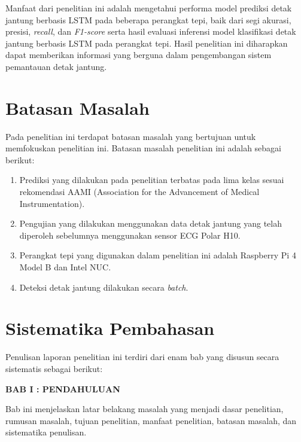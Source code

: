 Manfaat dari penelitian ini adalah mengetahui performa model prediksi detak jantung berbasis LSTM pada beberapa perangkat tepi, baik dari segi akurasi, presisi, \emph{recall}, dan \emph{F1-score} serta hasil evaluasi inferensi model klasifikasi detak jantung berbasis LSTM pada perangkat tepi.
Hasil penelitian ini diharapkan dapat memberikan informasi yang berguna dalam pengembangan sistem pemantauan detak jantung.


\section{Batasan Masalah}

Pada penelitian ini terdapat batasan masalah yang bertujuan untuk memfokuskan penelitian ini. Batasan masalah penelitian ini adalah sebagai berikut:
\begin{enumerate}
  \item Prediksi yang dilakukan pada penelitian terbatas pada lima kelas sesuai rekomendasi AAMI (Association for the Advancement of Medical Instrumentation).
  \item Pengujian yang dilakukan menggunakan data detak jantung yang telah diperoleh sebelumnya menggunakan sensor ECG Polar H10.
  \item Perangkat tepi yang digunakan dalam penelitian ini adalah Raspberry Pi 4 Model B dan Intel NUC.
  \item Deteksi detak jantung dilakukan secara \textit{batch}.
\end{enumerate}




\section{Sistematika Pembahasan}

Penulisan laporan penelitian ini terdiri dari enam bab yang disusun secara sistematis sebagai berikut:

\noindent
\textbf{BAB I : PENDAHULUAN}

Bab ini menjelaskan latar belakang masalah yang menjadi dasar penelitian, rumusan masalah, tujuan penelitian, manfaat penelitian, batasan masalah, dan sistematika penulisan.\\

